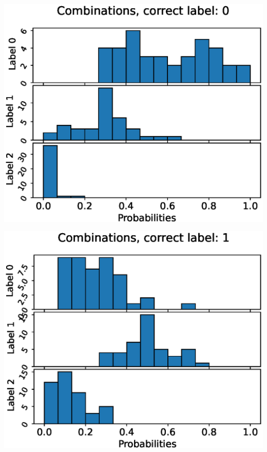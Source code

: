 \begin{center}
\begin{minipage}{0.33\textwidth}
  \includegraphics[width=\textwidth]{files/figs/app/hists/femval/c0.eps}
\end{minipage}%
\begin{minipage}{0.33\textwidth}
  \includegraphics[width=\textwidth]{files/figs/app/hists/femval/c1.eps}
\end{minipage}%
\begin{minipage}{0.33\textwidth}

\end{minipage}
\end{center}
